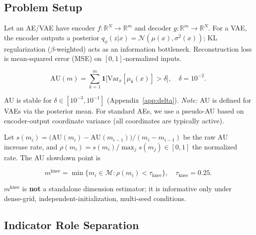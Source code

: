 \documentclass[make,article,submit,pdftex,moreauthors]{Definitions/mdpi}
\newcommand{\mknee}{m^{\mathrm{knee}}}
\newcommand{\R}{\mathbb{R}}
\begin{document}
\subsection{Problem Setup}

Let an AE/VAE have encoder $f:\R^N \to \R^m$ and decoder $g:\R^m \to \R^N$.
For a VAE, the encoder outputs a posterior
$q_\phi(z|x) = \mathcal{N}(\mu(x), \sigma^2(x))$;
KL regularization ($\beta$-weighted) acts as an information bottleneck.
Reconstruction loss is mean-squared error (MSE) on $[0,1]$-normalized inputs.

\begin{Definition}\label{def:au}
\begin{linenomath}
\begin{equation}
  \mathrm{AU}(m) = \sum_{k=1}^{m}
    \mathbf{1}\!\bigl[\mathrm{Var}_x[\mu_k(x)] > \delta\bigr],
  \quad \delta = 10^{-2}.
  \label{eq:au_def}
\end{equation}
\end{linenomath}
AU is stable for $\delta \in [10^{-3}, 10^{-1}]$
(Appendix~\ref{app:delta}).
\emph{Note:} AU is defined for VAEs via the posterior mean.
For standard AEs, we use a pseudo-AU based on encoder-output coordinate
variance (all coordinates are typically active).
\end{Definition}

\begin{Definition}\label{def:mknee}
Let $s(m_i) = \bigl(\mathrm{AU}(m_i) - \mathrm{AU}(m_{i-1})\bigr)
              / (m_i - m_{i-1})$
be the raw AU increase rate, and
$\rho(m_i) = s(m_i) / \max_j s(m_j) \in [0, 1]$
the normalized rate.
The AU slowdown point is
\begin{linenomath}
\begin{equation}
  \mknee = \min\bigl\{m_i \in \mathcal{M} :
                      \rho(m_i) < \tau_{\mathrm{knee}}\bigr\},
  \quad \tau_{\mathrm{knee}} = 0.25.
  \label{eq:mknee}
\end{equation}
\end{linenomath}
$\mknee$ is \textbf{not} a standalone dimension estimator; it is informative
only under dense-grid, independent-initialization, multi-seed conditions.
\end{Definition}

\subsection{Indicator Role Separation}
\end{document}
